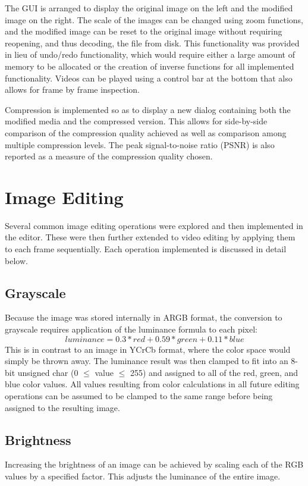 \documentclass[10pt,twocolumn,twoside]{IEEEtran}
\begin{document}
The GUI is arranged to display the original image on the left and the modified image on the right. The scale of the images can be changed using zoom functions, and the modified image can be reset to the original image without requiring reopening, and thus decoding, the file from disk. This functionality was provided in lieu of undo/redo functionality, which would require either a large amount of memory to be allocated or the creation of inverse functions for all implemented functionality. Videos can be played using a control bar at the bottom that also allows for frame by frame inspection.

Compression is implemented so as to display a new dialog containing both the modified media and the compressed version. This allows for side-by-side comparison of the compression quality achieved as well as comparison among multiple compression levels. The peak signal-to-noise ratio (PSNR) is also reported as a measure of the compression quality chosen. 

\section{Image Editing}
Several common image editing operations were explored and then implemented in the editor. These were then further extended to video editing by applying them to each frame sequentially. Each operation implemented is discussed in detail below.

\subsection{Grayscale}
Because the image was stored internally in ARGB format, the conversion to grayscale requires application of the luminance formula to each pixel: \begin{equation*}luminance = 0.3*red + 0.59*green + 0.11*blue \end{equation*}
This is in contrast to an image in YCrCb format, where the color space would simply be thrown away. The luminance result was then clamped to fit into an 8-bit unsigned char (0 $\leq$ value $\leq$ 255) and assigned to all of the red, green, and blue color values. All values resulting from color calculations in all future editing operations can be assumed to be clamped to the same range before being assigned to the resulting image. 

\subsection{Brightness}
Increasing the brightness of an image can be achieved by scaling each of the RGB values by a specified factor. This adjusts the luminance of the entire image.
\end{document}
